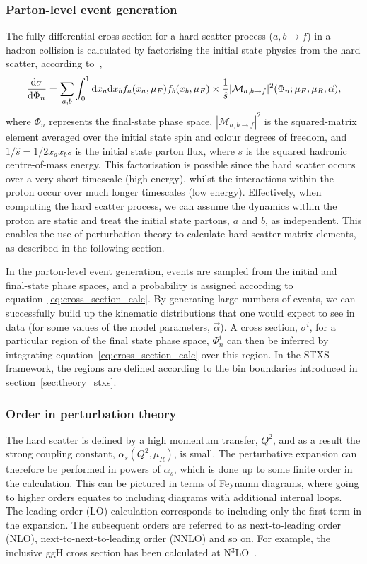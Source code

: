\subsubsection{Parton-level event generation}
The fully differential cross section for a hard scatter process ($a,b \rightarrow f$) in a hadron collision is calculated by factorising the initial state physics from the hard scatter, according to~\cite{ellis_stirling_webber_1996},
\begin{equation}\label{eq:cross_section_calc}
    \frac{{\rm{d}}\sigma}{{\rm{d}}\Phi_n} = \sum_{a,b} \int^1_0 {\rm{d}}x_a {\rm{d}}x_b f_a(x_a,\mu_F) f_b(x_b,\mu_F) \times \frac{1}{\hat{s}}|\mathcal{M}_{a,b\rightarrow f}|^2(\Phi_n;\mu_F,\mu_R,\vec{\alpha}),
\end{equation}
\noindent
where $\Phi_n$ represents the final-state phase space, $|\mathcal{M}_{a,b\rightarrow f}|^2$ is the squared-matrix element averaged over the initial state spin and colour degrees of freedom, and $1/\hat{s}=1/2x_ax_bs$ is the initial state parton flux, where $s$ is the squared hadronic centre-of-mass energy. This factorisation is possible since the hard scatter occurs over a very short timescale (high energy), whilst the interactions within the proton occur over much longer timescales (low energy). Effectively, when computing the hard scatter process, we can assume the dynamics within the proton are static and treat the initial state partons, $a$ and $b$, as independent. This enables the use of perturbation theory to calculate hard scatter matrix elements, as described in the following section.

In the parton-level event generation, events are sampled from the initial and final-state phase spaces, and a probability is assigned according to equation~\ref{eq:cross_section_calc}. By generating large numbers of events, we can successfully build up the kinematic distributions that one would expect to see in data (for some values of the model parameters, $\vec{\alpha}$). A cross section, $\sigma^i$, for a particular region of the final state phase space, $\Phi^i_n$ can then be inferred by integrating equation~\ref{eq:cross_section_calc} over this region. In the STXS framework, the regions are defined according to the bin boundaries introduced in section~\ref{sec:theory_stxs}.

\subsubsection{Order in perturbation theory}
The hard scatter is defined by a high momentum transfer, $Q^2$, and as a result the strong coupling constant, $\alpha_s(Q^2,\mu_R)$, is small. The perturbative expansion can therefore be performed in powers of $\alpha_s$, which is done up to some finite order in the calculation. This can be pictured in terms of Feynamn diagrams,
where going to higher orders equates to including diagrams with additional internal loops. The leading order (LO) calculation corresponds to including only the first term in the expansion. The subsequent orders are referred to as next-to-leading order (NLO), next-to-next-to-leading order (NNLO) and so on. For example, the inclusive ggH cross section has been calculated at N$^{3}$LO~\cite{Anastasiou:2016cez}.

